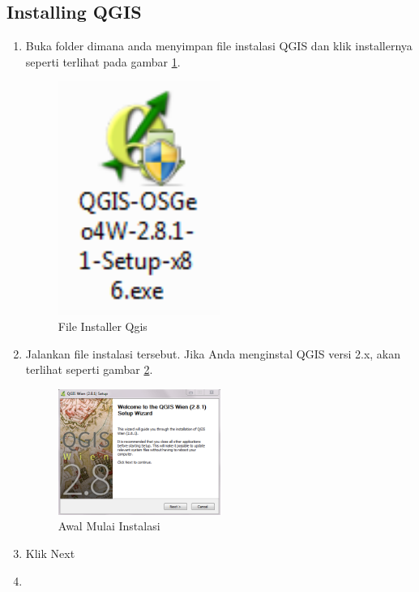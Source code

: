 \subsection{Installing QGIS}
\begin{enumerate}
\item
Buka folder dimana anda menyimpan file instalasi QGIS dan klik installernya seperti terlihat pada gambar \ref{image5}.
\begin{figure}[ht]
        \centerline{\includegraphics[width=0.5\textwidth]{figures/image5}}
        \caption{File Installer Qgis}
        \label{image5}
        \end{figure}
\item
Jalankan file instalasi tersebut. Jika Anda menginstal QGIS versi 2.x, akan terlihat seperti gambar \ref{image6}.
\begin{figure}[ht]
        \centerline{\includegraphics[width=0.5\textwidth]{figures/image6}}
        \caption{Awal Mulai Instalasi}
        \label{image6}
        \end{figure}
\item 
Klik Next
\item

\end{enumerate}
